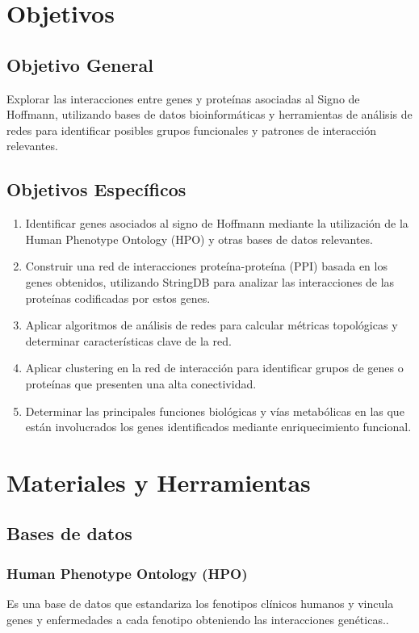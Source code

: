 \section{Objetivos}
\subsection{Objetivo General}

Explorar las interacciones entre genes y proteínas asociadas al Signo de Hoffmann, utilizando bases de datos bioinformáticas y herramientas de análisis de redes para identificar posibles grupos funcionales y patrones de interacción relevantes.

\subsection{Objetivos Específicos}
\begin{enumerate}
	\item Identificar genes asociados al signo de Hoffmann mediante la utilización de la Human Phenotype Ontology (HPO) y otras bases de datos relevantes.
	\item Construir una red de interacciones proteína-proteína (PPI) basada en los genes obtenidos, utilizando StringDB para analizar las interacciones de las proteínas codificadas por estos genes.
	\item Aplicar algoritmos de análisis de redes para calcular métricas topológicas y determinar características clave de la red.
	\item Aplicar clustering en la red de interacción para identificar grupos de genes o proteínas que presenten una alta conectividad.
	\item Determinar las principales funciones biológicas y vías metabólicas en las que están involucrados los genes identificados mediante enriquecimiento funcional.
\end{enumerate}

\section{Materiales y Herramientas}

\subsection{Bases de datos}

\subsubsection{Human Phenotype Ontology (HPO)}
  Es una base de datos que estandariza los fenotipos clínicos humanos y vincula genes y enfermedades a cada fenotipo obteniendo las interacciones genéticas.\cite{gargano2024}. 
